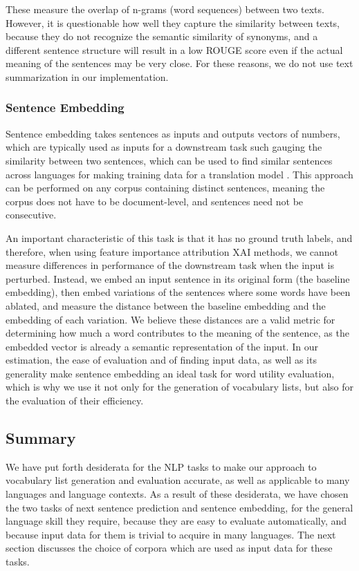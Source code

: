 These measure the overlap of n-grams (word sequences) between two texts.
However, it is questionable how well they capture the similarity between texts, because they do not recognize the semantic similarity of synonyms, and a different sentence structure will result in a low ROUGE score even if the actual meaning of the sentences may be very close.
For these reasons, we do not use text summarization in our implementation.


\subsubsection{Sentence Embedding} \label{sec:sentence-embedding}
Sentence embedding takes sentences as inputs and outputs vectors of numbers, which are typically used as inputs for a downstream task such gauging the similarity between two sentences, which can be used to find similar sentences across languages for making training data for a translation model \cite{artetxeMassivelyMultilingualSentence2019} \cite{reimersMakingMonolingualSentence2020}.
This approach can be performed on any corpus containing distinct sentences, meaning the corpus does not have to be document-level, and sentences need not be consecutive.

An important characteristic of this task is that it has no ground truth labels, and therefore, when using feature importance attribution XAI methods, we cannot measure differences in performance of the downstream task when the input is perturbed.
Instead, we embed an input sentence in its original form (the baseline embedding), then embed variations of the sentences where some words have been ablated, and measure the distance between the baseline embedding and the embedding of each variation.
We believe these distances are a valid metric for determining how much a word contributes to the meaning of the sentence, as the embedded vector is already a semantic representation of the input.
In our estimation, the ease of evaluation and of finding input data, as well as its generality make sentence embedding an ideal task for word utility evaluation, which is why we use it not only for the generation of vocabulary lists, but also for the evaluation of their efficiency.

\subsection{Summary}
We have put forth desiderata for the NLP tasks to make our approach to vocabulary list generation and evaluation accurate, as well as applicable to many languages and language contexts.
As a result of these desiderata, we have chosen the two tasks of next sentence prediction and sentence embedding, for the general language skill they require, because they are easy to evaluate automatically, and because input data for them is trivial to acquire in many languages.
The next section discusses the choice of corpora which are used as input data for these tasks.


